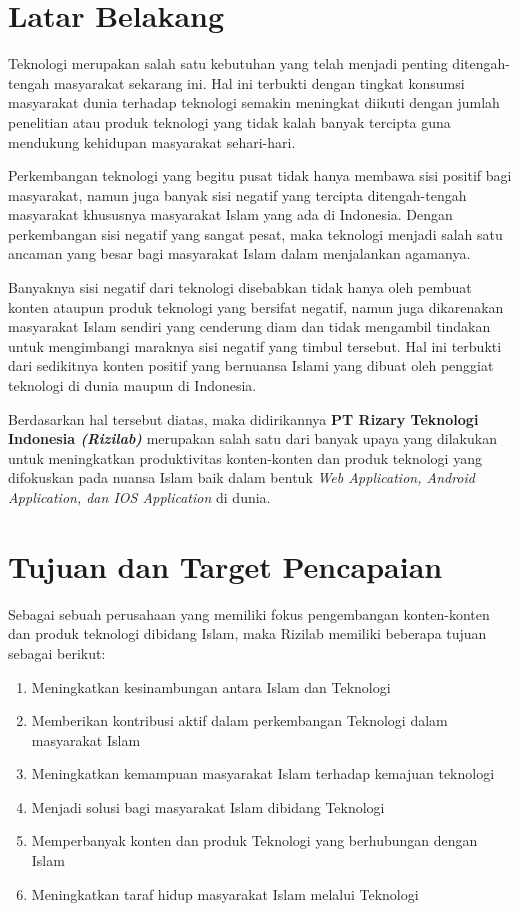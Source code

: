 \documentclass[Rizilab.tex]{subfile}
\begin{document}
\section{Latar Belakang}
Teknologi merupakan salah satu kebutuhan yang telah menjadi penting ditengah-tengah masyarakat sekarang ini. Hal ini terbukti dengan tingkat konsumsi masyarakat dunia terhadap teknologi semakin meningkat diikuti dengan jumlah penelitian atau produk teknologi yang tidak kalah banyak tercipta guna mendukung kehidupan masyarakat sehari-hari.

Perkembangan teknologi yang begitu pusat tidak hanya membawa sisi positif bagi masyarakat, namun juga banyak sisi negatif yang tercipta ditengah-tengah masyarakat khususnya masyarakat Islam yang ada di Indonesia. Dengan perkembangan sisi negatif yang sangat pesat, maka teknologi menjadi salah satu ancaman yang besar bagi masyarakat Islam dalam menjalankan agamanya.

Banyaknya sisi negatif dari teknologi disebabkan tidak hanya oleh pembuat konten ataupun produk teknologi yang bersifat negatif, namun juga dikarenakan masyarakat Islam sendiri yang cenderung diam dan tidak mengambil tindakan untuk mengimbangi maraknya sisi negatif yang timbul tersebut. Hal ini terbukti dari sedikitnya konten positif yang bernuansa Islami yang dibuat oleh penggiat teknologi di dunia maupun di Indonesia.

Berdasarkan hal tersebut diatas, maka didirikannya {\bfseries PT Rizary Teknologi Indonesia \itshape (Rizilab)} merupakan salah satu dari banyak upaya yang dilakukan untuk meningkatkan produktivitas konten-konten dan produk teknologi yang difokuskan pada nuansa Islam baik dalam bentuk {\itshape Web Application, Android Application, dan IOS Application} di dunia.

\section{Tujuan dan Target Pencapaian}
Sebagai sebuah perusahaan yang memiliki fokus pengembangan konten-konten dan produk teknologi dibidang Islam, maka Rizilab memiliki beberapa tujuan sebagai berikut:
  \begin{enumerate}
    \item Meningkatkan kesinambungan antara Islam dan Teknologi
    \item Memberikan kontribusi aktif dalam perkembangan Teknologi dalam masyarakat Islam
    \item Meningkatkan kemampuan masyarakat Islam terhadap kemajuan teknologi
    \item Menjadi solusi bagi masyarakat Islam dibidang Teknologi
    \item Memperbanyak konten dan produk Teknologi yang berhubungan dengan Islam
    \item Meningkatkan taraf hidup masyarakat Islam melalui Teknologi
  \end{enumerate}
\end{document}
